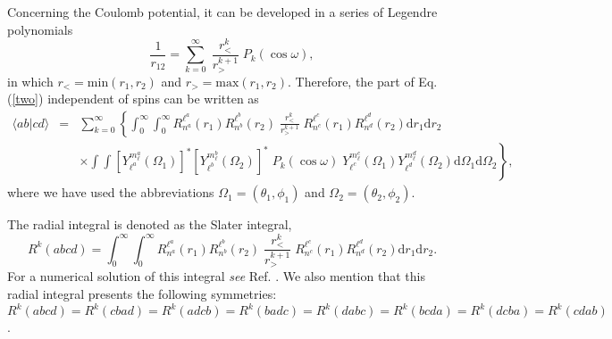 \documentclass[]{interact}
\def\refe#1{{\color{blue}\textsf{Eq.}\,(\ref{#1})}}
\def\d{\mathrm{d}}
\renewcommand{\l}{\ell}
\begin{document}
Concerning the Coulomb potential, it can be developed in a series of Legendre polynomials
\begin{equation}
 \frac{1}{r_{12}}=\sum_{k=0}^\infty\;\frac{r_<^k}{r_>^{k+1}}\;P_k(\cos\omega),
\end{equation}
in which $r_<=\mathrm{min}(r_1,r_2)$ and $r_>=\mathrm{max}(r_1,r_2)$. Therefore, the part of \refe{two} independent of spins can be written as
\begin{equation}
\begin{array}{lll}
\label{integral0}
 \langle ab|cd \rangle &=& \sum_{k=0}^\infty\left\{\int_0^\infty\int_0^\infty R_{n^a}^{\l^a}(r_1)R_{n^b}^{\l^b}(r_2)\;\frac{r_<^k}{r_>^{k+1}}\;R_{n^c}^{\l^c}(r_1)R_{n^d}^{\l^d}(r_2)\d r_1\d r_2\right.\\
 &&\left.\times\int\int\left[Y_{\l^a}^{m_\l^a}(\Omega_1)\right]^*\left[Y_{\l^b}^{m_\l^b}(\Omega_2)\right]^*\;P_k(\cos\omega)\;Y_{\l^c}^{m_\l^c}(\Omega_1)Y_{\l^d}^{m_\l^d}(\Omega_2)\d\Omega_1\d\Omega_2\right\},
\end{array}
\end{equation}
where we have used the abbreviations $\Omega_1=(\theta_1,\phi_1)$ and $\Omega_2=(\theta_2,\phi_2)$.

The radial integral is denoted as the Slater integral, 
\begin{equation}
\label{slater}
 R^k(abcd)=\int_0^\infty\int_0^\infty R_{n^a}^{\l^a}(r_1)R_{n^b}^{\l^b}(r_2)\;\frac{r_<^k}{r_>^{k+1}}\;R_{n^c}^{\l^c}(r_1)R_{n^d}^{\l^d}(r_2)\d r_1\d r_2.
\end{equation}
For a numerical solution of this integral \emph{see} Ref. \cite{Fischer}. We also mention that this radial integral presents the following symmetries: $R^k(abcd)=R^k(cbad)=R^k(adcb)=R^k(badc)=R^k(dabc)=R^k(bcda)=R^k(dcba)=R^k(cdab)$. 
\end{document}
